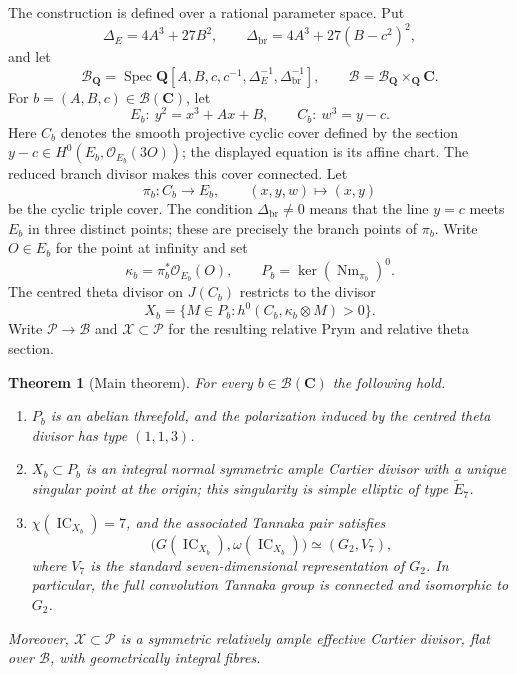 \documentclass[10pt]{amsart}
\numberwithin{equation}{section}
\newtheorem{theorem}{Theorem}[section]
\theoremstyle{definition}
\theoremstyle{remark}
\newcommand{\CC}{\mathbf C}
\newcommand{\QQ}{\mathbf Q}
\newcommand{\IC}{\operatorname{IC}}
\newcommand{\Nm}{\operatorname{Nm}}
\newcommand{\cB}{\mathcal B}
\newcommand{\cP}{\mathcal P}
\newcommand{\cX}{\mathcal X}
\newcommand{\wt}{\widetilde}
\begin{document}
The construction is defined over a rational parameter space.  Put
\[
 \Delta_E=4A^3+27B^2,
 \qquad
 \Delta_{\mathrm{br}}=4A^3+27(B-c^2)^2,
\]
and let
\[
 \cB_{\QQ}=\operatorname{Spec}
 \QQ[A,B,c,c^{-1},\Delta_E^{-1},\Delta_{\mathrm{br}}^{-1}],
 \qquad
 \cB=\cB_{\QQ}\times_{\QQ}\CC.
\]
For $b=(A,B,c)\in\cB(\CC)$, let
\[
 E_b:\ y^2=x^3+Ax+B,
 \qquad
 C_b:\ w^3=y-c.
\]
Here $C_b$ denotes the smooth projective cyclic cover defined by the section
$y-c\in H^0(E_b,\mathcal O_{E_b}(3O))$; the displayed equation is its
affine chart.  The reduced branch divisor makes this cover connected.  Let
\[
 \pi_b:C_b\longrightarrow E_b,
 \qquad (x,y,w)\longmapsto(x,y)
\]
be the cyclic triple cover.  The condition $\Delta_{\mathrm{br}}\ne0$
means that the line $y=c$ meets $E_b$ in three distinct points; these are
precisely the branch points of $\pi_b$.  Write $O\in E_b$ for the point at
infinity and set
\[
 \kappa_b=\pi_b^*\mathcal O_{E_b}(O),
 \qquad
 P_b=\ker(\Nm_{\pi_b})^0.
\]
The centred theta divisor on $J(C_b)$ restricts to the divisor
\[
 X_b=\{M\in P_b:h^0(C_b,\kappa_b\otimes M)>0\}.
\]
Write $\cP\to\cB$ and $\cX\subset\cP$ for the resulting relative Prym and
relative theta section.

\begin{theorem}[Main theorem]\label{thm:main}
For every $b\in\cB(\CC)$ the following hold.
\begin{enumerate}[label=\textup{(\roman*)},leftmargin=*]
\item $P_b$ is an abelian threefold, and the polarization induced by the
      centred theta divisor has type $(1,1,3)$.
\item $X_b\subset P_b$ is an integral normal symmetric ample Cartier divisor
      with a unique singular point at the origin; this singularity is simple
      elliptic of type $\wt E_7$.
\item $\chi(\IC_{X_b})=7$, and the associated Tannaka pair satisfies
\[
  \bigl(G(\IC_{X_b}),\omega(\IC_{X_b})\bigr)\simeq(G_2,V_7),
\]
      where $V_7$ is the standard seven-dimensional representation of
      $G_2$.  In particular, the full convolution Tannaka group is connected
      and isomorphic to $G_2$.
\end{enumerate}
Moreover, $\cX\subset\cP$ is a symmetric relatively ample effective Cartier
divisor, flat over $\cB$, with geometrically integral fibres.
\end{theorem}
\end{document}
